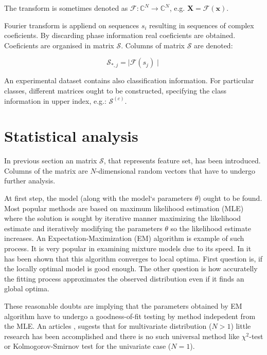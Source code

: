 \documentclass[a4paper,journal]{IEEEtran}
\begin{document}
The transform is sometimes denoted as 
$\mathcal{F}\colon\mathbb{C}^N \to \mathbb{C}^N$, e.g.
$\mathbf{X} = \mathcal{F} \left ( \mathbf{x} \right )$.

Fourier transform is appliend on sequences $s_i$ resulting in sequences of complex coeficients.
By discarding phase information real coeficients are obtained.
Coeficients are organised in matrix $\mathcal{S}$. Columns of matrix $\mathcal{S}$ are denoted:

\begin{equation}
\mathcal{S}_{*,j} = \mid\mathcal{F}(s_{j})\mid
\end{equation}

An experimental dataset contains also classification information. For particular classes,
different matrices ought to be constructed, specifying the class information in upper index, 
e.g.: $\mathcal{S}^{(c)}$.

\section{Statistical analysis}\label{sec:stats}
In previous section an matrix $\mathcal{S}$, that represents feature set, has been introduced.
Columns of the matrix are $N$-dimensional random vectors that have to undergo further analysis.

At first step, the model (along with the model`s parameters $\theta$) ought to be found.
Most popular methods are based on maximum likelihood estimation (MLE) where the solution is sought by 
iterative manner maximizing the likelihood estimate and iteratively modifying the parameters $\theta$ so the likelihood
estimate increases. An Expectation-Maximization (EM) algorithm is example of such process. It is very popular in 
examining mixture models due to its speed. In \cite{Bor04} it has been shown that this algorithm converges 
to local optima. First question is, if the locally optimal model is good enough. The other question is how accuratelly 
the fitting process approximates the observed distribution even if it finds an global optima.

These reasonable doubts are implying that the parameters obtained by EM algorithm have to undergo a goodness-of-fit
testing by method indepedent from the MLE.
An articles \cite{Nar03}, \cite{Ros62} sugests that for multivariate distribution ($N > 1$) little research
has been accomplished and there is no such universal method like $\chi^2$-test or  Kolmogorov-Smirnov test
for the univariate case ($N=1$). 
\end{document}
